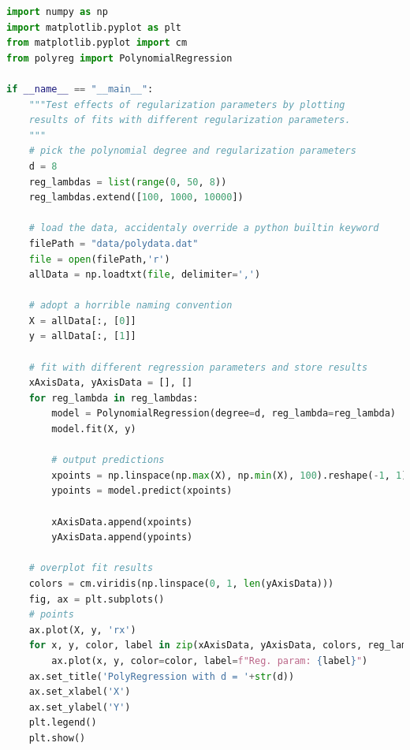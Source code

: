 \documentclass{article}
\newcommand{\1}{\mathbf{1}}
\begin{document}
\begin{lstlisting}[language=Python]
import numpy as np
import matplotlib.pyplot as plt
from matplotlib.pyplot import cm
from polyreg import PolynomialRegression

if __name__ == "__main__":
    """Test effects of regularization parameters by plotting
    results of fits with different regularization parameters.
    """
    # pick the polynomial degree and regularization parameters
    d = 8
    reg_lambdas = list(range(0, 50, 8))
    reg_lambdas.extend([100, 1000, 10000])

    # load the data, accidentaly override a python builtin keyword
    filePath = "data/polydata.dat"
    file = open(filePath,'r')
    allData = np.loadtxt(file, delimiter=',')

    # adopt a horrible naming convention
    X = allData[:, [0]]
    y = allData[:, [1]]

    # fit with different regression parameters and store results
    xAxisData, yAxisData = [], []
    for reg_lambda in reg_lambdas:
        model = PolynomialRegression(degree=d, reg_lambda=reg_lambda)
        model.fit(X, y)

        # output predictions
        xpoints = np.linspace(np.max(X), np.min(X), 100).reshape(-1, 1)
        ypoints = model.predict(xpoints)

        xAxisData.append(xpoints)
        yAxisData.append(ypoints)

    # overplot fit results
    colors = cm.viridis(np.linspace(0, 1, len(yAxisData)))
    fig, ax = plt.subplots()
    # points
    ax.plot(X, y, 'rx')
    for x, y, color, label in zip(xAxisData, yAxisData, colors, reg_lambdas):
        ax.plot(x, y, color=color, label=f"Reg. param: {label}")
    ax.set_title('PolyRegression with d = '+str(d))
    ax.set_xlabel('X')
    ax.set_ylabel('Y')
    plt.legend()
    plt.show()
\end{lstlisting} 
\end{document}
